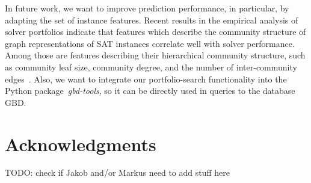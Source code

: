 \documentclass[conference]{IEEEtran}
\newcommand{\todo}[1]{{\color{red}TODO: #1}}
\begin{document}
In future work, we want to improve prediction performance, in particular, by adapting the set of instance features. %
Recent results in the empirical analysis of solver portfolios indicate that features which describe the community structure of graph representations of SAT instances correlate well with solver performance. %
Among those are features describing their hierarchical community structure, such as community leaf size, community degree, and the number of inter-community edges~\cite{Li:2021:HCS}. 
Also, we want to integrate our portfolio-search functionality %
into the Python package~\emph{gbd-tools}, so it can be directly used in queries to the database GBD. %
\section*{Acknowledgments}

\todo{check if Jakob and/or Markus need to add stuff here}

\balance %



\end{document}
